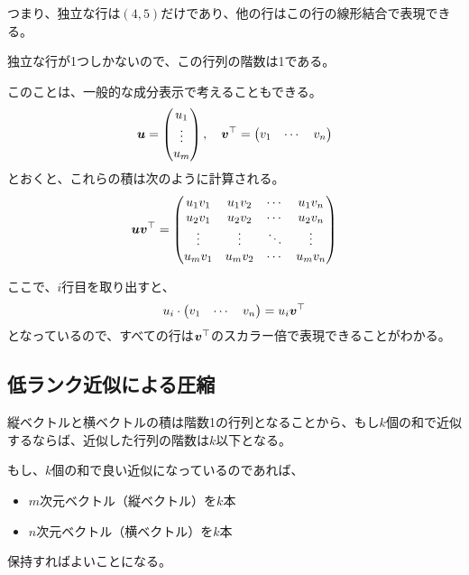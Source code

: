 \documentclass[../../../topic_linear-algebra]{subfiles}
\begin{document}
つまり、独立な行は$(4,5)$だけであり、他の行はこの行の線形結合で表現できる。

独立な行が1つしかないので、この行列の階数は1である。

\br

このことは、一般的な成分表示で考えることもできる。
\begin{equation*}
  \vb*{u} = \begin{pmatrix}
    u_1 \\
    \vdots \\
    u_m
  \end{pmatrix}, \quad
  \vb*{v}^\top = \begin{pmatrix}
    v_1 & \cdots & v_n
  \end{pmatrix}
\end{equation*}
とおくと、これらの積は次のように計算される。
\begin{equation*}
  \vb*{u} \vb*{v}^\top = \begin{pmatrix}
    u_1 v_1 & u_1 v_2 & \cdots & u_1 v_n \\
    u_2 v_1 & u_2 v_2 & \cdots & u_2 v_n \\
    \vdots  & \vdots  & \ddots & \vdots  \\
    u_m v_1 & u_m v_2 & \cdots & u_m v_n
  \end{pmatrix}
\end{equation*}

ここで、$i$行目を取り出すと、
\begin{equation*}
  u_i \cdot \begin{pmatrix}
    v_1 & \cdots & v_n
  \end{pmatrix} = u_i \vb*{v}^\top
\end{equation*}
となっているので、すべての行は$\vb*{v}^\top$のスカラー倍で表現できることがわかる。

\subsection{低ランク近似による圧縮}

縦ベクトルと横ベクトルの積は階数1の行列となることから、もし$k$個の和で近似するならば、近似した行列の階数は$k$以下となる。

もし、$k$個の和で良い近似になっているのであれば、
\begin{itemize}
  \item $m$次元ベクトル（縦ベクトル）を$k$本
  \item $n$次元ベクトル（横ベクトル）を$k$本
\end{itemize}
保持すればよいことになる。
\end{document}

